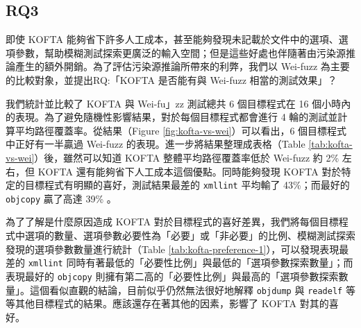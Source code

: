 \iffalse
\subsection{RQ3}
\label{sec:rq-eff}

即使 KOFTA 能夠省下許多人工成本，甚至能夠發現未記載於文件中的選項、選項參數，幫助模糊測試探索更廣泛的輸入空間；但是這些好處也伴隨著由污染源推論產生的額外開銷。為了評估污染源推論所帶來的利弊，我們以 Wei-fuzz 為主要的比較對象，並提出RQ:「KOFTA 是否能有與 Wei-fuzz 相當的測試效果」？

我們統計並比較了 KOFTA 與 Wei-fu」zz 測試總共 6 個目標程式在 16 個小時內的表現。為了避免隨機性影響結果，對於每個目標程式都會進行 4 輪的測試並計算平均路徑覆蓋率。從結果（Figure \ref{fig:kofta-vs-wei}）可以看出，6 個目標程式中正好有一半贏過 Wei-fuzz 的表現。進一步將結果整理成表格（Table \ref{tab:kofta-vs-wei}）後，雖然可以知道 KOFTA 整體平均路徑覆蓋率低於 Wei-fuzz 約 2\% 左右，但 KOFTA 還有能夠省下人工成本這個優點。同時能夠發現 KOFTA 對於特定的目標程式有明顯的喜好，測試結果最差的 \texttt{xmllint} 平均輸了 43\%；而最好的 \texttt{objcopy} 贏了高達 39\% 。

為了了解是什麼原因造成 KOFTA 對於目標程式的喜好差異，我們將每個目標程式中選項的數量、選項參數必要性為「必要」或「非必要」的比例、模糊測試探索發現的選項參數數量進行統計（Table \ref{tab:kofta-preference-1}），可以發現表現最差的 \texttt{xmllint} 同時有著最低的「必要性比例」與最低的「選項參數探索數量」；而表現最好的 \texttt{objcopy} 則擁有第二高的「必要性比例」與最高的「選項參數探索數量」。這個看似直觀的結論，目前似乎仍然無法很好地解釋 \texttt{objdump} 與  \texttt{readelf} 等等其他目標程式的結果。應該還存在著其他的因素，影響了 KOFTA 對其的喜好。


